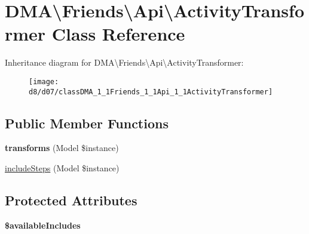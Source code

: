 \hypertarget{classDMA_1_1Friends_1_1Api_1_1ActivityTransformer}{\section{D\+M\+A\textbackslash{}Friends\textbackslash{}Api\textbackslash{}Activity\+Transformer Class Reference}
\label{classDMA_1_1Friends_1_1Api_1_1ActivityTransformer}
}
Inheritance diagram for D\+M\+A\textbackslash{}Friends\textbackslash{}Api\textbackslash{}Activity\+Transformer\+:\begin{figure}[H]
\begin{center}
\leavevmode
\texttt{[image: d8/d07/classDMA\_1\_1Friends\_1\_1Api\_1\_1ActivityTransformer]}
\end{center}
\end{figure}
\subsection*{Public Member Functions}
\begin{DoxyCompactItemize}
\item 
\hypertarget{classDMA_1_1Friends_1_1Api_1_1ActivityTransformer_a7d5e972a572a1448f4d230124d0d747e}{{\bfseries transforms} (Model \$instance)}\label{classDMA_1_1Friends_1_1Api_1_1ActivityTransformer_a7d5e972a572a1448f4d230124d0d747e}

\item 
\hyperlink{classDMA_1_1Friends_1_1Api_1_1ActivityTransformer_ad840be788d75759d0c2eb9874acb9b4a}{include\+Steps} (Model \$instance)
\end{DoxyCompactItemize}
\subsection*{Protected Attributes}
\begin{DoxyCompactItemize}
\item 
{\bfseries \$available\+Includes}
\end{DoxyCompactItemize}


